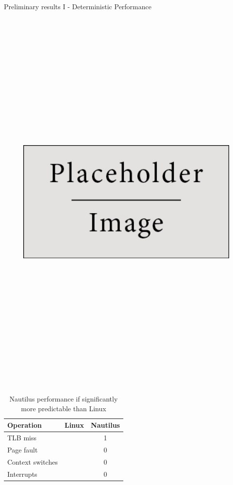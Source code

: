 
\begin{block}{Preliminary results I - Deterministic Performance}

  \begin{figure}
    \includegraphics[height=20cm]{place_holder.png}

  \end{figure}

  \begin{table}
    \begin{tabular}{l || c | c }
      Operation & Linux & Nautilus \\
      \hline\hline
      TLB miss & & 1 \\
      Page fault & & 0 \\
      Context switches & & 0 \\
      Interrupts & & 0 \\
    \end{tabular}

    \caption{Nautilus performance if significantly more predictable than Linux}
  \end{table}

\end{block}
